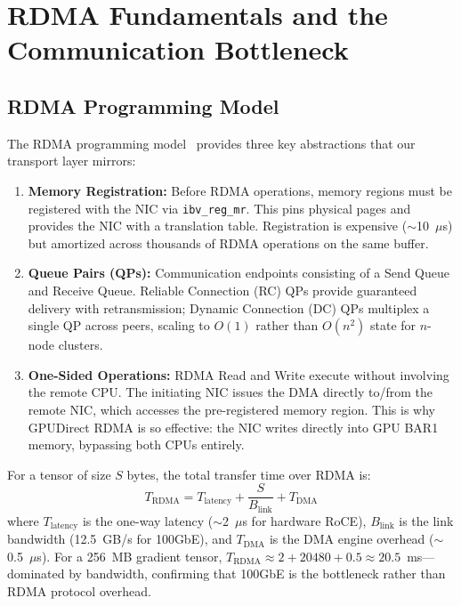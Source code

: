 \documentclass[11pt,letterpaper]{article}
\theoremstyle{definition}
\begin{document}
\section{RDMA Fundamentals and the Communication Bottleneck}
\label{sec:rdma-fundamentals}

\subsection{RDMA Programming Model}

The RDMA programming model~\cite{infiniband-rdma} provides three key abstractions that our transport layer mirrors:

\begin{enumerate}
    \item \textbf{Memory Registration:} Before RDMA operations, memory regions must be registered with the NIC via \texttt{ibv\_reg\_mr}. This pins physical pages and provides the NIC with a translation table. Registration is expensive ($\sim$10~$\mu$s) but amortized across thousands of RDMA operations on the same buffer.

    \item \textbf{Queue Pairs (QPs):} Communication endpoints consisting of a Send Queue and Receive Queue. Reliable Connection (RC) QPs provide guaranteed delivery with retransmission; Dynamic Connection (DC) QPs multiplex a single QP across peers, scaling to $O(1)$ rather than $O(n^2)$ state for $n$-node clusters.

    \item \textbf{One-Sided Operations:} RDMA Read and Write execute without involving the remote CPU. The initiating NIC issues the DMA directly to/from the remote NIC, which accesses the pre-registered memory region. This is why GPUDirect RDMA is so effective: the NIC writes directly into GPU BAR1 memory, bypassing both CPUs entirely.
\end{enumerate}

For a tensor of size $S$ bytes, the total transfer time over RDMA is:
\begin{equation}
    T_{\text{RDMA}} = T_{\text{latency}} + \frac{S}{B_{\text{link}}} + T_{\text{DMA}}
\end{equation}
where $T_{\text{latency}}$ is the one-way latency ($\sim$2~$\mu$s for hardware RoCE), $B_{\text{link}}$ is the link bandwidth (12.5~GB/s for 100GbE), and $T_{\text{DMA}}$ is the DMA engine overhead ($\sim$0.5~$\mu$s). For a 256~MB gradient tensor, $T_{\text{RDMA}} \approx 2 + 20480 + 0.5 \approx 20.5$~ms---dominated by bandwidth, confirming that 100GbE is the bottleneck rather than RDMA protocol overhead.
\end{document}
